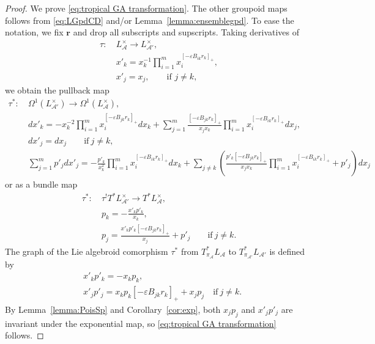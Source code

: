\documentclass{amsart}
\numberwithin{equation}{section}
\newcommand{\bfr}{{\boldsymbol{r}}}
\newcommand{\cA}{\mathcal{A}}
\begin{document}
\begin{proof}
  We prove \eqref{eq:tropical GA transformation}.
  The other groupoid maps follows from \eqref{eq:LGpdCD} and/or Lemma~\ref{lemma:ensemblegpd}.
  To ease the notation, we fix $\bfr$ and drop all subscripts and supscripts.
  Taking derivatives of
  \begin{align*}
    \tau:~ & L^\times_{\cA}\to L^\times_{\cA'}, \\
      & x'_k =x_k^{-1}\prod\limits_{i=1}^m x_i^{[-\varepsilon B_{ik}r_k]_+}, \\
      & x'_j = x_j, \qquad \text{if } j \ne k,
  \end{align*}
  we obtain the pullback map
  \begin{align*}
    \tau^*:~ & \Omega^1(L^\times_{\cA'}) \to \Omega^1(L^\times_{\cA}), \\
      & dx'_k = - x_k^{-2}\prod\limits_{i=1}^m x_i^{[- \varepsilon B_{jk} r_k]_+} dx_k + \sum\limits_{j=1}^m \frac{[- \varepsilon B_{jk} r_k]_+}{x_j x_k} \prod\limits_{i=1}^m x_i^{[- \varepsilon B_{ik} r_k]_+} dx_j, \\
      & dx'_j = dx_j \qquad \text{if}~j\ne k, \\
      & \sum\limits_{j=1}^m p'_j dx'_j = - \frac{p'_k}{x_k^2}\prod\limits_{i=1}^m x_i^{[- \varepsilon B_{ik} r_k]_+} dx_k + \sum\limits_{j\ne k} \left(\frac{p'_k [- \varepsilon B_{jk} r_k]_+ }{x_jx_k} \prod\limits_{i=1}^m x_i^{[- \varepsilon B_{ik} r_k]_+}  + p'_j\right)dx_j
  \end{align*}
  or as a bundle map
  \begin{align*}
    \tau^*:~ & \tau^! T^* L^\times_{\cA'} \to T^* L^\times_{\cA},  \\
      & p_k = - \frac{x'_k p'_k}{x_k}, \\
      & p_j = \frac{x'_kp'_k [- \varepsilon B_{jk} r_k]_+ }{x_j}   + p'_j \qquad \text{if}~j\ne k.
  \end{align*}
  The graph of the Lie algebroid comorphism $\tau^*$ from $T^*_{\pi_{\cA}} L_{\cA}$ to $T^*_{\pi_{\cA'}} L_{\cA'}$ is defined by
  \begin{align*}
    & x'_k p'_k = - x_k p_k , \\
    & x'_j p'_j = x_kp_k [- \varepsilon B_{jk} r_k]_+  + x_jp_j \quad \text{if}~j\ne k.
  \end{align*}
  By Lemma~\ref{lemma:PoisSp} and Corollary~\ref{cor:exp}, both $x_j p_j$ and $x'_j p'_j$ are invariant under the exponential map, so \eqref{eq:tropical GA transformation} follows.
\end{proof}
\end{document}
